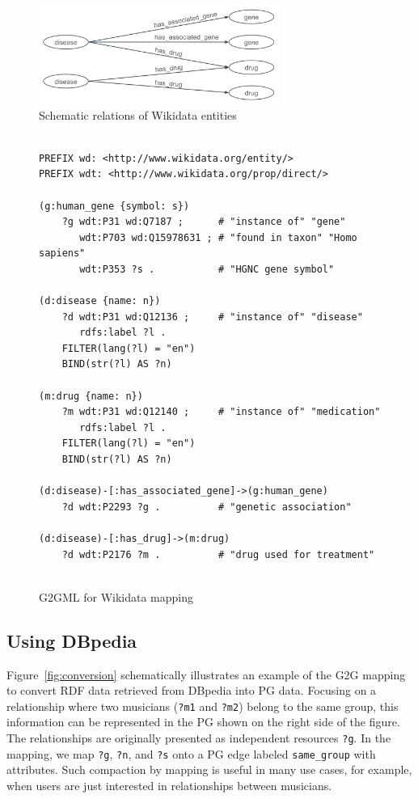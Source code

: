 \documentclass[runningheads]{llncs}
\begin{document}
\begin{figure}
\center
\includegraphics[width=0.7\textwidth]{wikidata_schema.png}
\caption{Schematic relations of Wikidata entities}
\label{fig:wikidata_schema.png}
\end{figure}
 
\begin{figure}[!t]
\vspace{2mm}
\begin{scriptsize}
\begin{verbatim}
 
PREFIX wd: <http://www.wikidata.org/entity/>
PREFIX wdt: <http://www.wikidata.org/prop/direct/>
 
(g:human_gene {symbol: s})
    ?g wdt:P31 wd:Q7187 ;      # "instance of" "gene"
       wdt:P703 wd:Q15978631 ; # "found in taxon" "Homo sapiens"
       wdt:P353 ?s .           # "HGNC gene symbol"
 
(d:disease {name: n})
    ?d wdt:P31 wd:Q12136 ;     # "instance of" "disease"
       rdfs:label ?l .
    FILTER(lang(?l) = "en")
    BIND(str(?l) AS ?n)
 
(m:drug {name: n})
    ?m wdt:P31 wd:Q12140 ;     # "instance of" "medication"
       rdfs:label ?l .
    FILTER(lang(?l) = "en")
    BIND(str(?l) AS ?n)
 
(d:disease)-[:has_associated_gene]->(g:human_gene)
    ?d wdt:P2293 ?g .          # "genetic association"
 
(d:disease)-[:has_drug]->(m:drug)
    ?d wdt:P2176 ?m .          # "drug used for treatment"
 
\end{verbatim}
\end{scriptsize}
\caption{G2GML for Wikidata mapping}
\label{fig:g2gml_wikidata}
\end{figure}
 
\subsection{Using DBpedia}
 
Figure~\ref{fig:conversion} schematically illustrates an example of the G2G mapping to convert RDF data retrieved from DBpedia into PG data. 
Focusing on a relationship where two musicians (\texttt{?m1} and \texttt{?m2}) belong to the same group, this information can be represented in the PG shown on the right side of the figure. The relationships are originally presented as independent resources \texttt{?g}. In the mapping, we map \texttt{?g}, \texttt{?n}, and \texttt{?s} onto a PG edge labeled \texttt{same\_group} with attributes. Such compaction by mapping is useful in many use cases, for example, when users are just interested in relationships between musicians.
 
\end{document}
